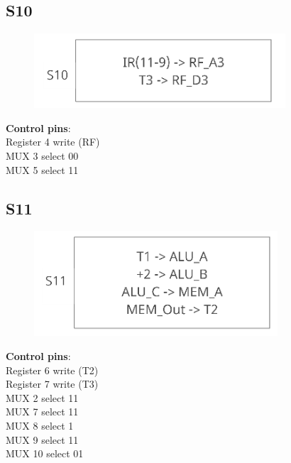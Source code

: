 \documentclass[11pt, fleqn]{article}
\begin{document}
\subsection*{S10}
\begin{figure}[H]
    \centering
    \includegraphics{DataPath/DataPath_S10.PNG}
\end{figure}
\textbf{Control pins}: \\
Register 4 write (RF) \\
MUX 3 select 00 \\
MUX 5 select 11 \\

\subsection*{S11}
\begin{figure}[H]
    \centering
    \includegraphics{DataPath/DataPath_S11.PNG}
\end{figure}
\textbf{Control pins}: \\
Register 6 write (T2) \\
Register 7 write (T3) \\
MUX 2 select 11 \\
MUX 7 select 11 \\
MUX 8 select 1 \\
MUX 9 select 11 \\
MUX 10 select 01 \\
\end{document}
